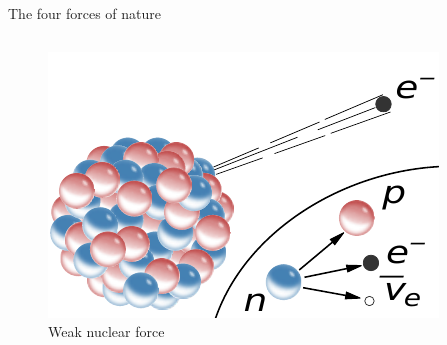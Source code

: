 \documentclass[10pt,show notes on second screen]{beamer}
\begin{document}
\begin{frame}{The four forces of nature}
\begin{columns}
\begin{minipage}[b][0.45\textheight][b]{\linewidth}
{\begin{figure}
            \centering
            \includegraphics[width=0.6\linewidth]{../figures/weakforce_pdf}
            \captionsetup{labelformat=empty}
            \caption{Weak nuclear force}
        \end{figure}}
    \end{minipage}
    \begin{minipage}[b][0.45\textheight][b]{\linewidth}
    \end{minipage}
\end{columns}
\end{frame}
\end{document}
